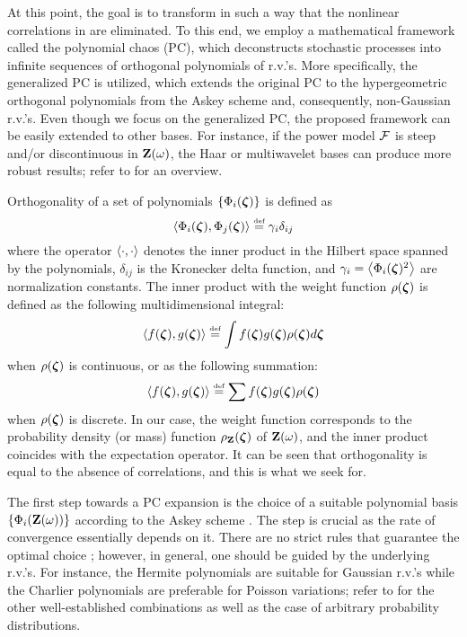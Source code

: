 At this point, the goal is to transform  in such a way that the nonlinear correlations in  are eliminated. To this end, we employ a mathematical framework called the polynomial chaos (PC), which deconstructs stochastic processes into infinite sequences of orthogonal polynomials of r.v.'s. More specifically, the generalized PC \cite{xiu2002} is utilized, which extends the original PC \cite{ghanem1991} to the hypergeometric orthogonal polynomials from the Askey scheme and, consequently, non-Gaussian r.v.'s. Even though we focus on the generalized PC, the proposed framework can be easily extended to other bases. For instance, if the power model $\mathcal{F}$ is steep and/or discontinuous in $\mathbf{Z}(\omega)$, the Haar or multiwavelet bases can produce more robust results; refer to \cite{maitre2010} for an overview.

Orthogonality of a set of polynomials $\{ \Phi_i(\boldsymbol{\zeta}) \}$ is defined as
\begin{equation} \elabel{orthogonality}
  \oInner{\pcb_i(\vz)}{\pcb_j(\vz)} \eqdef \pcn_i \delta_{ij}
\end{equation}
where the operator $\oInner{\idot}{\idot}$ denotes the inner product in the Hilbert space spanned by the polynomials, $\delta_{ij}$ is the Kronecker delta function, and $\pcn_i = \oInner{\pcb_i(\vz)^2}$ are normalization constants. The inner product with the weight function $\rho(\boldsymbol{\zeta})$ is defined as the following multidimensional integral:
\begin{equation} \elabel{inner-product-integral}
  \oInner{f(\vz)}{g(\vz)} \eqdef \int f(\vz) g(\vz) \PDF(\vz) d\vz
\end{equation}
when $\rho(\boldsymbol{\zeta})$ is continuous, or as the following summation:
\begin{equation} \elabel{inner-product-sum}
  \oInner{f(\vz)}{g(\vz)} \eqdef \sum f(\vz) g(\vz) \PDF(\vz)
\end{equation}
when $\rho(\boldsymbol{\zeta})$ is discrete. In our case, the weight function corresponds to the probability density (or mass) function $\rho_{\mathbf{Z}}(\boldsymbol{\zeta})$ of $\mathbf{Z}(\omega)$, and the inner product coincides with the expectation operator. It can be seen that orthogonality is equal to the absence of correlations, and this is what we seek for.

The first step towards a PC expansion is the choice of a suitable polynomial basis $\{ \Phi_i(\mathbf{Z}(\omega)) \}$ according to the Askey scheme \cite{xiu2002}. The step is crucial as the rate of convergence essentially depends on it. There are no strict rules that guarantee the optimal choice \cite{knio2006, maitre2010}; however, in general, one should be guided by the underlying r.v.'s. For instance, the Hermite polynomials are suitable for Gaussian r.v.'s while the Charlier polynomials are preferable for Poisson variations; refer to \cite{xiu2002} for the other well-established combinations as well as the case of arbitrary probability distributions.

